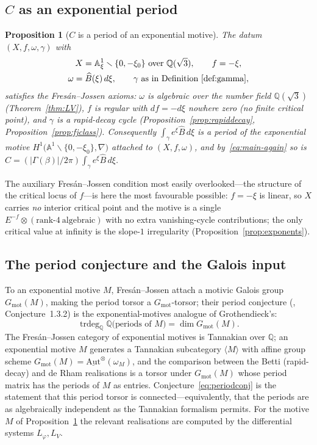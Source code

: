\documentclass[11pt,reqno]{amsart}
\renewcommand{\_}{\vquadorigunderscore\allowbreak}
\theoremstyle{plain}
\newtheorem{proposition}[theorem]{Proposition}
\theoremstyle{definition}
\newcommand{\Bhat}{\widehat{B}}
\newcommand{\Lphi}{L_{\varphi}}
\newcommand{\LV}{L_{V}}
\newcommand{\Qsqrt}{\mathbb{Q}(\sqrt3)}
\newcommand{\xizero}{\xi_0}
\providecommand{\C}{}\renewcommand{\C}{C}
\begin{document}
\subsection{$\C$ as an exponential period}
\begin{proposition}[$\C$ is a period of an exponential motive]\label{prop:expperiod}
The datum $(X,f,\omega,\gamma)$ with
\[
\begin{gathered}
  X=\mathbb{A}^1_\xi\smallsetminus\{0,-\xizero\}\ \text{over }\Qsqrt,\qquad f=-\xi,\\
  \omega=\Bhat(\xi)\,d\xi,\qquad \gamma\ \text{as in Definition~\ref{def:gamma}},
\end{gathered}
\]
satisfies the Fres\'an--Jossen axioms: $\omega$ is algebraic over the number field $\Qsqrt$
(Theorem~\ref{thm:LV}), $f$ is regular with $df=-d\xi$ nowhere zero (no finite critical point),
and $\gamma$ is a rapid-decay cycle (Proposition~\ref{prop:rapiddecay},
Proposition~\ref{prop:fjclass}). Consequently $\int_\gamma e^{\xi}\Bhat\,d\xi$ is a period of the
exponential motive $H^1\bigl(\mathbb{A}^1\smallsetminus\{0,-\xizero\},\nabla\bigr)$ attached to
$(X,f,\omega)$, and by~\eqref{eq:main-again} so is $\C=(\lvert\Gamma(\beta)\rvert/2\pi)\int_\gamma
e^{\xi}\Bhat\,d\xi$.
\end{proposition}

The auxiliary Fres\'an--Jossen condition most easily overlooked---the structure of the critical
locus of $f$---is here the most favourable possible: $f=-\xi$ is linear, so $X$ carries \emph{no}
interior critical point and the motive is a single $E^{-f}\otimes(\text{rank-}4\ \text{algebraic})$
with no extra vanishing-cycle contributions; the only critical value at infinity is the slope-$1$
irregularity (Proposition~\ref{prop:exponents}).

\subsection{The period conjecture and the Galois input}
To an exponential motive $M$, Fres\'an--Jossen attach a motivic Galois group $G_{\mathrm{mot}}(M)$,
making the period torsor a $G_{\mathrm{mot}}$-torsor; their period conjecture
(\cite{FJ}, Conjecture~1.3.2) is the exponential-motives analogue of Grothendieck's:
\begin{equation}\label{eq:periodconj}
  \operatorname{trdeg}_{\mathbb{Q}}\mathbb{Q}\bigl(\text{periods of }M\bigr)
  =\dim G_{\mathrm{mot}}(M).
\end{equation}
The Fres\'an--Jossen category of exponential motives is Tannakian over $\mathbb{Q}$; an
exponential motive $M$ generates a Tannakian subcategory $\langle M\rangle$ with affine group
scheme $G_{\mathrm{mot}}(M)=\underline{\mathrm{Aut}}^{\otimes}(\omega_M)$, and the comparison
between the Betti (rapid-decay) and de Rham realisations is a torsor under $G_{\mathrm{mot}}(M)$
whose period matrix has the periods of $M$ as entries. Conjecture~\eqref{eq:periodconj} is the
statement that this period torsor is connected---equivalently, that the periods are as
algebraically independent as the Tannakian formalism permits. For the motive $M$ of
Proposition~\ref{prop:expperiod} the relevant realisations are computed by the differential systems
$\Lphi,\LV$.
\end{document}
